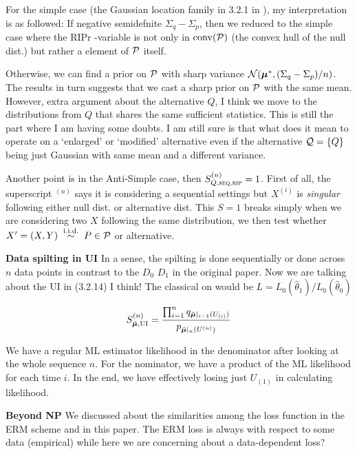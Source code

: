 For the simple case (the Gaussian location family in 3.2.1 in \cite{haoEvaluesAnytimevalidInference2025}), 
my interpretation is as followed:
If negative semidefnite $\Sigma_q-\Sigma_p$, then we reduced to the simple case where the RIPr \E-variable is not only
in $\mathrm{conv}(\mathcal{P})$ (the convex hull of the null dist.) but rather a element of $\mathcal{P}$ itself.

Otherwise, we can find a prior on $\mathcal{P}$ with sharp variance $\mathcal{N}(\bm{\mu}^*, (\Sigma_q-\Sigma_p)/n)$.
The results in turn suggests that we cast a sharp prior on $\mathcal{P}$ with the same mean.
However, extra argument about the alternative $Q$, I think we move to the distributions from $Q$ 
that shares the same sufficient statistics. 
This is still the part where I am having some doubts. 
I am still sure is that what does it mean to operate on a `enlarged' or `modified' 
alternative even if the alternative $\mathcal{Q}=\{Q\}$ being just Gaussian with same mean and a different variance.

Another point is in the Anti-Simple case, then $S_{Q,\textsc{seq,rip}}^{(n)} =1$. 
First of all, the superscript $^{(n)}$ says it is considering a sequential settings 
but $X^{(i)}$ is \emph{singular} following either null dist. or alternative dist.
This $S=1$ breaks simply when we are considering two $X$ following the same distribution,
we then test whether $X' = (X, Y) \; \overset{\mathrm{i.i.d.}}{\sim} \; P \in \mathcal{P}$ or alternative.

\textbf{Data spilting in UI} \quad In a sense, the spilting is done sequentially or done across $n$
data points in contrast to the $D_0$ $D_1$ in the original paper. Now we are talking about the UI in (3.2.14)
I think! The classical on would be $L = L_0(\hat{\theta}_1)/L_0(\hat{\theta}_0)$

\begin{align*}
    S_{\breve{\bm{\mu}},\textsc{UI}}^{(n)} = 
        \frac{\prod_{i=1}^n q_{\breve{\bm{\mu}}|_{i-1}(U_{(i)})}}
        {p_{\breve{\bm{\mu}}|_n(U^{(n)})}}
\end{align*}

We have a regular ML estimator likelihood in the denominator after looking at the whole sequence $n$.
For the nominator, we have a product of the ML likelihood for each time $i$. 
In the end, we have effectively losing just $U_{(1)}$ in calculating likelihood.

\textbf{Beyond NP} \quad We discussed about the similarities among the loss function in the ERM scheme 
and in this paper. The ERM loss is always with respect to some data (empirical) while
here we are concerning about a data-dependent loss?

